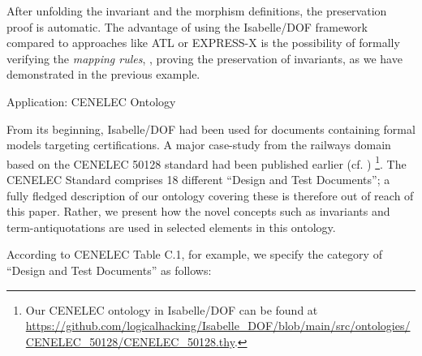 \begin{isabellebody}
\begin{isamarkuptext}
After unfolding
the invariant and the morphism definitions, the preservation proof is automatic. The advantage 
of using the Isabelle/DOF framework compared to approaches like ATL or EXPRESS-X is 
the possibility of formally verifying the \emph{mapping rules}, \ie,  proving the preservation 
of invariants, as we have demonstrated in the previous example.
\end{isamarkuptext}\isamarkuptrue%

\begin{isamarkupsection*}
[label = {appl_certif},type = {scholarly_paper.technical}, args={label = {appl_certif},type = {scholarly_paper.technical}, Isa_COL.text_element.level = {}, Isa_COL.text_element.referentiable = {False}, Isa_COL.text_element.variants = {{STR ''outline'', STR ''document''}}, scholarly_paper.text_section.main_author = {}, scholarly_paper.text_section.fixme_list = {}, Isa_COL.text_element.level = {}, scholarly_paper.technical.definition_list = {}, scholarly_paper.technical.status = {status.description}}]Application: CENELEC Ontology
\end{isamarkupsection*}\isamarkuptrue%

\begin{isamarkuptext}
From its beginning, Isabelle/DOF had been used for documents containing formal models targeting 
certifications. A major case-study from the railways domain based on the CENELEC 50128 standard
had been published earlier (cf. \cite{DBLP:conf-ifm-BruckerW19}) 
\footnote{Our CENELEC ontology in 
Isabelle/DOF can be found at 
\url{https://github.com/logicalhacking/Isabelle_DOF/blob/main/src/ontologies/CENELEC_50128/CENELEC_50128.thy}.}.
The CENELEC Standard comprises 18 different ``Design and Test Documents''; a fully fledged description of 
our ontology covering these is therefore out of reach of this paper.
Rather, we present how the novel concepts such as invariants and term-antiquotations are used in 
selected elements in this ontology.

According to CENELEC Table C.1, for example, we specify the category of ``Design and Test Documents''
as follows:

\begin{isarbox}


\end{isarbox}
\end{isamarkuptext}
\end{isabellebody}
